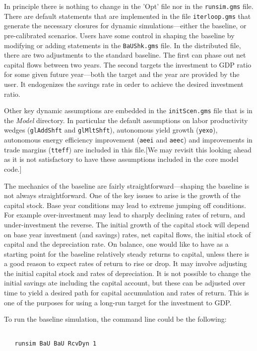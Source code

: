 In principle there is nothing to change in the 'Opt' file nor in the
\texttt{runsim.gms} file. There are default statements that are implemented in
the file \texttt{iterloop.gms} that generate the necessary closures for dynamic
simulations---either the baseline, or pre-calibrated scenarios. Users have some
control in shaping the baseline by modifying or adding statements in the
\texttt{BaUShk.gms} file. In the distributed file, there are two adjustments to
the standard baseline. The first can phase out net capital flows between two
years. The second targets the investment to GDP ratio for
some given future year---both the target and the year are provided by the user.
It endogenizes the savings rate in order to achieve the desired investment
ratio.

Other key dynamic assumptions are embedded in the \texttt{initScen.gms} file
that is in the \emph{Model} directory. In particular the default assumptions on
labor productivity wedges (\texttt{glAddShft} and \texttt{glMltShft}),
autonomous yield growth (\texttt{yexo}), autonomous energy efficiency
improvement (\texttt{aeei} and \texttt{aeec}) and improvements in trade
margins (\texttt{tteff}) are included in this file.[We may revisit this looking
ahead as it is not satisfactory to have these assumptions included in the core
model code.]

The mechanics of the baseline are fairly straightforward---shaping the baseline
is not always straightforward. One of the key issues to arise is the growth of
the capital stock. Base year conditions may lead to extreme jumping off
conditions. For example over-investment may lead to sharply declining rates of
return, and under-investment the reverse. The initial growth of the capital
stock will depend on base year investment (and savings) rates, net capital
flows, the initial stock of capital and the depreciation rate. On balance, one
would like to have as a starting point for the baseline relatively steady
returns to capital, unless there is a good reason to expect rates of return to
rise or drop. It may involve adjusting the initial capital stock and rates of
depreciation. It is not possible to change the initial savings ate including the
capital account, but these can be adjusted over time to yield a desired path for
capital accumulation and rates of return. This is one of the purposes for using
a long-run target for the investment to GDP.

To run the baseline simulation, the command line could be the following:

\begin{verbatim}

   runsim BaU BaU RcvDyn 1

\end{verbatim}

